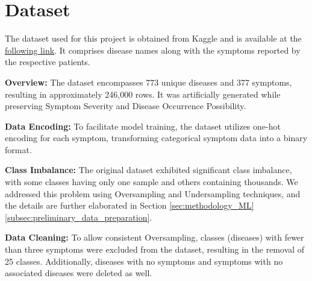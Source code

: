 \section{Dataset}

The dataset used for this project is obtained from Kaggle and is available at the
\href{https://www.kaggle.com/datasets/dhivyeshrk/diseases-and-symptoms-dataset?select=Final_Augmented_dataset_Diseases_and_Symptoms.csv}{following link}.
It comprises disease names along with the symptoms reported by the respective patients.

\noindent
\textbf{Overview:} The dataset encompasses 773 unique diseases and 377 symptoms, resulting in approximately 246,000 rows.
It was artificially generated while preserving Symptom Severity and Disease Occurrence Possibility.

\noindent
\textbf{Data Encoding:} To facilitate model training, the dataset utilizes one-hot encoding for each symptom, transforming
categorical symptom data into a binary format.

\noindent
\textbf{Class Imbalance:} The original dataset exhibited significant class imbalance, with some classes having only one
sample and others containing thousands. We addressed this problem using Oversampling and Undersampling techniques,
and the details are further elaborated in Section \ref{sec:methodology_ML}\ref{subsec:preliminary_data_preparation}.

\noindent
\textbf{Data Cleaning:} To allow consistent Oversampling, classes (diseases) with fewer than three symptoms were excluded
from the dataset, resulting in the removal of 25 classes. Additionally, diseases with no symptoms and symptoms with
no associated diseases were deleted as well.

